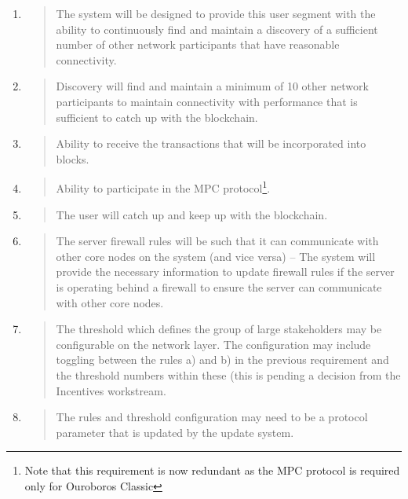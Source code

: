 \documentclass[11pt,a4paper]{article}
\begin{document}
\begin{enumerate}
\def\labelenumi{\arabic{enumi}.}
\setcounter{enumi}{3}
\item
  \begin{quote}
  The system will be designed to provide this user segment with the
  ability to continuously find and maintain a discovery of a sufficient
  number of other network participants that have reasonable
  connectivity.
  \end{quote}
\item
  \begin{quote}
  Discovery will find and maintain a minimum of 10 other network
  participants to maintain connectivity with performance that is
  sufficient to catch up with the blockchain.
  \end{quote}
\item
  \begin{quote}
  Ability to receive the transactions that will be incorporated into
  blocks.
  \end{quote}
\item
  \begin{quote}
  Ability to participate in the MPC protocol\footnote{Note that this
    requirement is now redundant as the MPC protocol is required only
    for Ouroboros Classic}.
  \end{quote}
\item
  \begin{quote}
  The user will catch up and keep up with the blockchain.
  \end{quote}
\item
  \begin{quote}
  The server firewall rules will be such that it can communicate with
  other core nodes on the system (and vice versa) -- The system will
  provide the necessary information to update firewall rules if the
  server is operating behind a firewall to ensure the server can
  communicate with other core nodes.
  \end{quote}
\item
  \begin{quote}
  The threshold which defines the group of large stakeholders may be
  configurable on the network layer. The configuration may include
  toggling between the rules a) and b) in the previous requirement and
  the threshold numbers within these (this is pending a decision from
  the Incentives workstream.
  \end{quote}
\item
  \begin{quote}
  The rules and threshold configuration may need to be a protocol
  parameter that is updated by the update system.
  \end{quote}
\end{enumerate}
\end{document}
